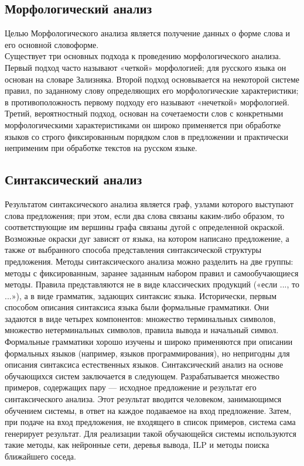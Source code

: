 \subsection{Морфологический анализ}
Целью Морфологического анализа является получение данных о форме слова и его основной словоформе.\\
Существует три основных подхода к проведению морфологического анализа. Первый подход часто называют «четкой» морфологией; для русского языка он основан на словаре Зализняка. Второй подход основывается на некоторой системе правил, по заданному слову определяющих его морфологические характеристики; в противоположность первому подходу его называют «нечеткой» морфологией. Третий, вероятностный подход, основан на сочетаемости слов с конкретными морфологическими характеристиками он широко применяется при обработке языков со строго фиксированным порядком слов в предложении и практически неприменим при обработке текстов на русском языке.
\subsection{Синтаксический анализ}
Результатом синтаксического анализа является граф, узлами которого выступают слова предложения; при этом, если два слова связаны каким-либо образом, то соответствующие им вершины графа связаны дугой с определенной окраской. Возможные окраски дуг зависят от языка, на котором написано предложение, а также от выбранного способа представления синтаксической структуры предложения.
Методы синтаксического анализа можно разделить на две группы: методы с фиксированным, заранее заданным набором правил и самообучающиеся методы. Правила представляются не в виде классических продукций («если ..., то ...»), а в виде грамматик, задающих синтаксис языка. Исторически, первым способом описания синтаксиса языка были формальные грамматики. Они задаются в виде четырех компонентов: множество терминальных символов, множество нетерминальных символов, правила вывода и начальный символ. Формальные грамматики хорошо изучены и широко применяются при описании формальных языков (например, языков программирования), но непригодны для описания синтаксиса естественных языков. 
Синтаксический анализ на основе обучающихся систем  заключается в следующем. Разрабатывается множество примеров, содержащих пару — исходное предложение и результат его синтаксического анализа. Этот результат вводится человеком, занимающимся обучением системы, в ответ на каждое подаваемое на вход предложение. Затем, при подаче на вход предложения, не входящего в список примеров, система сама генерирует результат. Для реализации такой обучающейся системы используются такие методы, как нейронные сети, деревья вывода, ILP и методы поиска ближайшего соседа.

